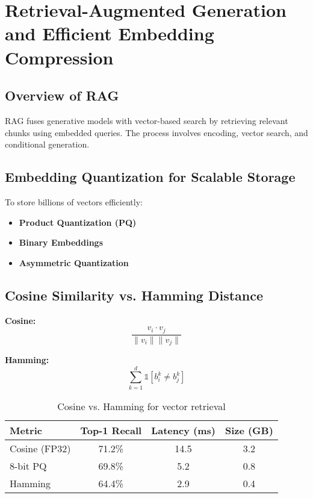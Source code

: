 \documentclass{article}
\begin{document}
\section{Retrieval-Augmented Generation and Efficient Embedding Compression}

\subsection{Overview of RAG}
RAG fuses generative models with vector-based search by retrieving relevant chunks using embedded queries. The process involves encoding, vector search, and conditional generation.

\subsection{Embedding Quantization for Scalable Storage}
To store billions of vectors efficiently:
\begin{itemize}
    \item \textbf{Product Quantization (PQ)}
    \item \textbf{Binary Embeddings}
    \item \textbf{Asymmetric Quantization}
\end{itemize}

\subsection{Cosine Similarity vs. Hamming Distance}
\begin{minipage}{0.48\textwidth}
\textbf{Cosine:}
\[
\frac{v_i \cdot v_j}{\|v_i\| \|v_j\|}
\]
\end{minipage}
\hfill
\begin{minipage}{0.48\textwidth}
\textbf{Hamming:}
\[
\sum_{k=1}^{d} \mathbb{1}[b_i^k \ne b_j^k]
\]
\end{minipage}

\begin{table}[H]
\centering
\begin{tabular}{lccc}
\toprule
\textbf{Metric} & \textbf{Top-1 Recall} & \textbf{Latency (ms)} & \textbf{Size (GB)} \\
\midrule
Cosine (FP32) & 71.2\% & 14.5 & 3.2 \\
8-bit PQ      & 69.8\% & 5.2  & 0.8 \\
Hamming       & 64.4\% & 2.9  & 0.4 \\
\bottomrule
\end{tabular}
\caption{Cosine vs. Hamming for vector retrieval}
\end{table}
\end{document}
